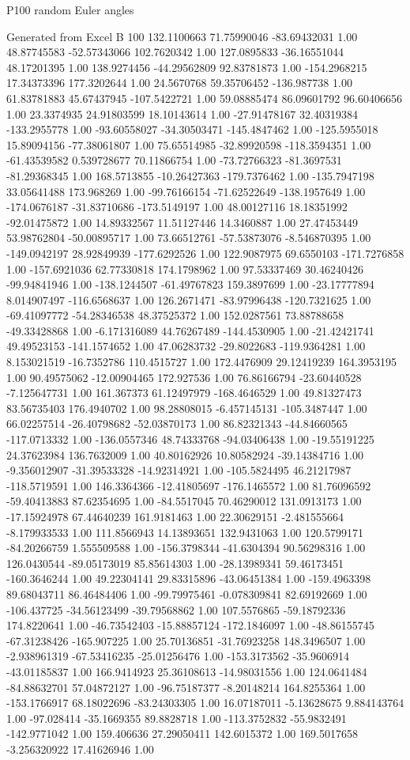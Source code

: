 P100 random Euler angles

Generated from Excel
B 100
132.1100663	71.75990046	-83.69432031 1.00
48.87745583	-52.57343066	102.7620342 1.00
127.0895833	-36.16551044	48.17201395 1.00
138.9274456	-44.29562809	92.83781873 1.00
-154.2968215	17.34373396	177.3202644 1.00
24.5670768	59.35706452	-136.987738 1.00
61.83781883	45.67437945	-107.5422721 1.00
59.08885474	86.09601792	96.60406656 1.00
23.3374935	24.91803599	18.10143614 1.00
-27.91478167	32.40319384	-133.2955778 1.00
-93.60558027	-34.30503471	-145.4847462 1.00
-125.5955018	15.89094156	-77.38061807 1.00
75.65514985	-32.89920598	-118.3594351 1.00
-61.43539582	0.539728677	70.11866754 1.00
-73.72766323	-81.3697531	-81.29368345 1.00
168.5713855	-10.26427363	-179.7376462 1.00
-135.7947198	33.05641488	173.968269 1.00
-99.76166154	-71.62522649	-138.1957649 1.00
-174.0676187	-31.83710686	-173.5149197 1.00
48.00127116	18.18351992	-92.01475872 1.00
14.89332567	11.51127446	14.3460887 1.00
27.47453449	53.98762804	-50.00895717 1.00
73.66512761	-57.53873076	-8.546870395 1.00
-149.0942197	28.92849939	-177.6292526 1.00
122.9087975	69.6550103	-171.7276858 1.00
-157.6921036	62.77330818	174.1798962 1.00
97.53337469	30.46240426	-99.94841946 1.00
-138.1244507	-61.49767823	159.3897699 1.00
-23.17777894	8.014907497	-116.6568637 1.00
126.2671471	-83.97996438	-120.7321625 1.00
-69.41097772	-54.28346538	48.37525372 1.00
152.0287561	73.88788658	-49.33428868 1.00
-6.171316089	44.76267489	-144.4530905 1.00
-21.42421741	49.49523153	-141.1574652 1.00
47.06283732	-29.8022683	-119.9364281 1.00
8.153021519	-16.7352786	110.4515727 1.00
172.4476909	29.12419239	164.3953195 1.00
90.49575062	-12.00904465	172.927536 1.00
76.86166794	-23.60440528	-7.125647731 1.00
161.367373	61.12497979	-168.4646529 1.00
49.81327473	83.56735403	176.4940702 1.00
98.28808015	-6.457145131	-105.3487447 1.00
66.02257514	-26.40798682	-52.03870173 1.00
86.82321343	-44.84660565	-117.0713332 1.00
-136.0557346	48.74333768	-94.03406438 1.00
-19.55191225	24.37623984	136.7632009 1.00
40.80162926	10.80582924	-39.14384716 1.00
-9.356012907	-31.39533328	-14.92314921 1.00
-105.5824495	46.21217987	-118.5719591 1.00
146.3364366	-12.41805697	-176.1465572 1.00
81.76096592	-59.40413883	87.62354695 1.00
-84.5517045	70.46290012	131.0913173 1.00
-17.15924978	67.44640239	161.9181463 1.00
22.30629151	-2.481555664	-8.179933533 1.00
111.8566943	14.13893651	132.9431063 1.00
120.5799171	-84.20266759	1.555509588 1.00
-156.3798344	-41.6304394	90.56298316 1.00
126.0430544	-89.05173019	85.85614303 1.00
-28.13989341	59.46173451	-160.3646244 1.00
49.22304141	29.83315896	-43.06451384 1.00
-159.4963398	89.68043711	86.46484406 1.00
-99.79975461	-0.078309841	82.69192669 1.00
-106.437725	-34.56123499	-39.79568862 1.00
107.5576865	-59.18792336	174.8220641 1.00
-46.73542403	-15.88857124	-172.1846097 1.00
-48.86155745	-67.31238426	-165.907225 1.00
25.70136851	-31.76923258	148.3496507 1.00
-2.938961319	-67.53416235	-25.01256476 1.00
-153.3173562	-35.9606914	-43.01185837 1.00
166.9414923	25.36108613	-14.98031556 1.00
124.0641484	-84.88632701	57.04872127 1.00
-96.75187377	-8.20148214	164.8255364 1.00
-153.1766917	68.18022696	-83.24303305 1.00
16.07187011	-5.13628675	9.884143764 1.00
-97.028414	-35.1669355	89.8828718 1.00
-113.3752832	-55.9832491	-142.9771042 1.00
159.406636	27.29050411	142.6015372 1.00
169.5017658	-3.256320922	17.41626946 1.00
